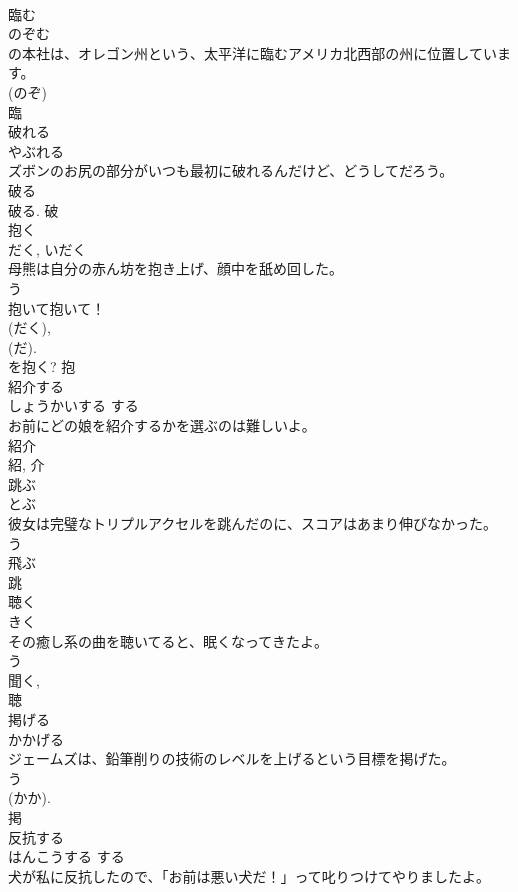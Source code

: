 \documentclass[8pt]{extreport}
\begin{document}
\begin{CJK}{UTF8}{min}
\\	臨む	
\\	のぞむ	
\\	の本社は、オレゴン州という、太平洋に臨むアメリカ北西部の州に位置しています。	
\\	(のぞ) 
\\	臨	
\\	破れる	
\\	やぶれる	
\\	ズボンのお尻の部分がいつも最初に破れるんだけど、どうしてだろう。	
\\	破る 
\\	破る.	破	
\\	抱く	
\\	だく, いだく	
\\	母熊は自分の赤ん坊を抱き上げ、顔中を舐め回した。	
\\	う 
\\	抱いて抱いて！	
\\	(だく), 
\\	(だ). 
\\	を抱く?	抱	
\\	紹介する	
\\	しょうかいする	する 
\\	お前にどの娘を紹介するかを選ぶのは難しいよ。	
\\	紹介 
\\	紹, 介	
\\	跳ぶ	
\\	とぶ	
\\	彼女は完璧なトリプルアクセルを跳んだのに、スコアはあまり伸びなかった。	
\\	う 
\\	飛ぶ 
\\	跳	
\\	聴く	
\\	きく	
\\	その癒し系の曲を聴いてると、眠くなってきたよ。	
\\	う 
\\	聞く, 
\\	聴	
\\	掲げる	
\\	かかげる	
\\	ジェームズは、鉛筆削りの技術のレベルを上げるという目標を掲げた。	
\\	う 
\\	(かか). 
\\	掲	
\\	反抗する	
\\	はんこうする	する 
\\	犬が私に反抗したので、「お前は悪い犬だ！」って叱りつけてやりましたよ。	

\end{CJK}
\end{document}
